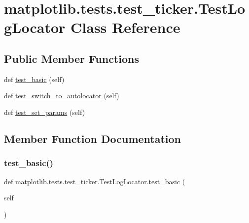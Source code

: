 \hypertarget{classmatplotlib_1_1tests_1_1test__ticker_1_1TestLogLocator}{}\section{matplotlib.\+tests.\+test\+\_\+ticker.\+Test\+Log\+Locator Class Reference}
\label{classmatplotlib_1_1tests_1_1test__ticker_1_1TestLogLocator}
\subsection*{Public Member Functions}
\begin{DoxyCompactItemize}
\item 
def \hyperlink{classmatplotlib_1_1tests_1_1test__ticker_1_1TestLogLocator_a796a2de1534854941055a3f94f2b4b73}{test\+\_\+basic} (self)
\item 
def \hyperlink{classmatplotlib_1_1tests_1_1test__ticker_1_1TestLogLocator_ad1e498a7cf47158f9300e582e01391e9}{test\+\_\+switch\+\_\+to\+\_\+autolocator} (self)
\item 
def \hyperlink{classmatplotlib_1_1tests_1_1test__ticker_1_1TestLogLocator_a239f5822dc1771184e1fc8d74b4978b0}{test\+\_\+set\+\_\+params} (self)
\end{DoxyCompactItemize}


\subsection{Member Function Documentation}
\mbox{\label{classmatplotlib_1_1tests_1_1test__ticker_1_1TestLogLocator_a796a2de1534854941055a3f94f2b4b73}} 
\subsubsection{\texorpdfstring{test\+\_\+basic()}{test\_basic()}}
{\footnotesize\ttfamily def matplotlib.\+tests.\+test\+\_\+ticker.\+Test\+Log\+Locator.\+test\+\_\+basic (\begin{DoxyParamCaption}\item[{}]{self }\end{DoxyParamCaption})}

